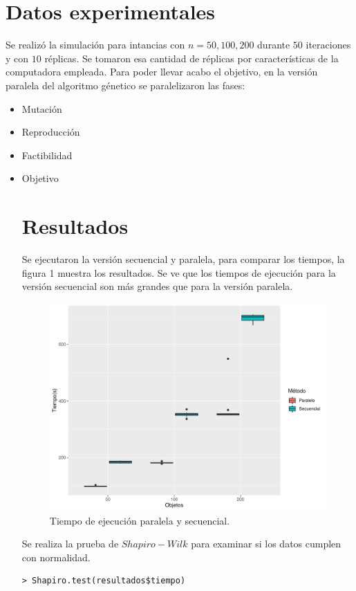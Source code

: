 \documentclass[12pt,letterpaper]{article}
\begin{document}
\section*{Datos experimentales }
 Se realizó la simulación para intancias con  $n=50,100,200$ durante $50$ iteraciones y con $10$ réplicas. Se tomaron esa cantidad de réplicas por características de la computadora empleada. 
 Para poder llevar acabo el objetivo, en la versión paralela del algoritmo génetico se paralelizaron las fases:
 \begin{itemize}
\item Mutación
\item Reproducción 
\item Factibilidad
\item Objetivo
 

 \newpage
\section*{Resultados}
Se ejecutaron la versión secuencial y paralela, para comparar los tiempos, la figura 1 muestra  los resultados. Se ve que los tiempos de ejecución para la versión secuencial son más grandes que para la versión paralela. 

\begin{figure}[ht]
  \centering
  \includegraphics[scale=.8]{Rplot}
  \caption{Tiempo de ejecución paralela y secuencial.}
\end{figure}
\newpage
Se realiza la prueba de $Shapiro-Wilk$ para examinar si los datos cumplen con normalidad. 
\begin{lstlisting}
> Shapiro.test(resultados$tiempo)


\end{lstlisting}
\end{itemize}
\end{document}
